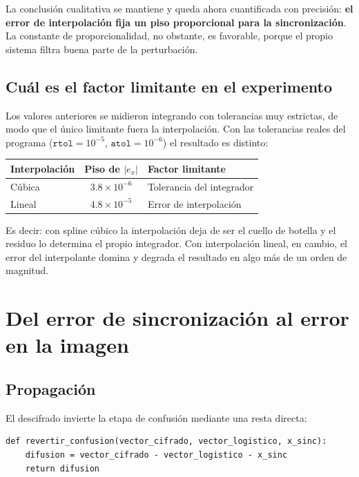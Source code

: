 \documentclass[12pt,a4paper]{article}
\begin{document}
La conclusión cualitativa se mantiene y queda ahora cuantificada con precisión: \textbf{el error de interpolación fija un piso proporcional para la sincronización}. La constante de proporcionalidad, no obstante, es favorable, porque el propio sistema filtra buena parte de la perturbación.

\subsection{Cuál es el factor limitante en el experimento}

Los valores anteriores se midieron integrando con tolerancias muy estrictas, de modo que el único limitante fuera la interpolación. Con las tolerancias reales del programa ($\texttt{rtol}=10^{-5}$, $\texttt{atol}=10^{-6}$) el resultado es distinto:

\begin{center}
\begin{tabularx}{0.92\textwidth}{@{}l c X@{}}
\toprule
\textbf{Interpolación} & \textbf{Piso de $|e_x|$} & \textbf{Factor limitante} \\
\midrule
Cúbica & $3.8\times10^{-6}$ & Tolerancia del integrador \\
Lineal & $4.8\times10^{-5}$ & Error de interpolación \\
\bottomrule
\end{tabularx}
\end{center}

Es decir: con spline cúbico la interpolación deja de ser el cuello de botella y el residuo lo determina el propio integrador. Con interpolación lineal, en cambio, el error del interpolante domina y degrada el resultado en algo más de un orden de magnitud.

\section{Del error de sincronización al error en la imagen}

\subsection{Propagación}

El descifrado invierte la etapa de confusión mediante una resta directa:
\begin{lstlisting}
def revertir_confusion(vector_cifrado, vector_logistico, x_sinc):
    difusion = vector_cifrado - vector_logistico - x_sinc
    return difusion
\end{lstlisting}
\end{document}
